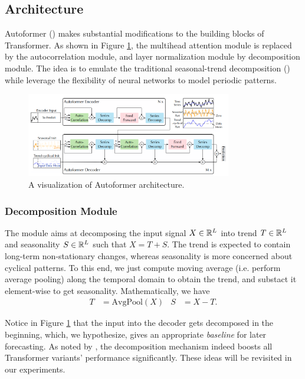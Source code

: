 \subsection{Architecture}
Autoformer (\citet{https://doi.org/10.48550/arxiv.2106.13008}) makes substantial modifications to the building blocks of Transformer. 
As shown in Figure \ref{fig:autoformer}, the multihead attention module is replaced by the autocorrelation module, and layer normalization module by decomposition module. 
The idea is to emulate the traditional seasonal-trend decomposition (\citet{cleveland90}) while leverage the flexibility of neural networks to model periodic patterns. 

\begin{figure}
    \centering
    \includegraphics[width=0.8\textwidth]{img/autoformer.png}
    \caption{A visualization of Autoformer architecture.}
    \label{fig:autoformer}
\end{figure}

\subsubsection{Decomposition Module}
The module aims at decomposing the input signal $X \in \mathbb{R}^L$ into trend $T \in \mathbb{R}^L$ and seasonality $S \in \mathbb{R}^L$ such that $X = T + S$. 
The trend is expected to contain long-term non-stationary changes, whereas seasonality is more concerned about cyclical patterns. 
To this end, we just compute moving average (i.e. perform average pooling) along the temporal domain to obtain the trend, and substact it element-wise to get seasonality. 
Mathematically, we have \begin{align*}
    T &= \text{AvgPool}(X) & S &= X - T.
\end{align*}

Notice in Figure \ref{fig:autoformer} that the input into the decoder gets decomposed in the beginning, which, we hypothesize, gives an appropriate \textit{baseline} for later forecasting. 
As noted by \citet{https://doi.org/10.48550/arxiv.2202.07125}, the decomposition mechanism indeed boosts all Transformer variants' performance significantly. 
These ideas will be revisited in our experiments. 

